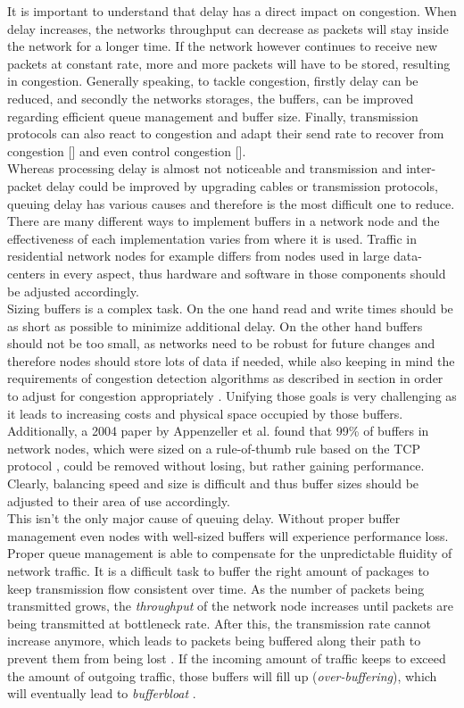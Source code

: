 \documentclass[a4paper,conference]{IEEEtran}
\begin{document}
It is important to understand that delay has a direct impact on congestion. When delay increases, the networks throughput can decrease as packets will stay inside the network for a longer time. If the network however continues to receive new packets at constant rate, more and more packets will have to be stored, resulting in congestion. Generally speaking, to tackle congestion, firstly delay can be reduced, and secondly the networks storages, the buffers, can be improved regarding efficient queue management and buffer size. Finally, transmission protocols can also react to congestion and adapt their send rate to recover from congestion [] and even control congestion [].
\\Whereas processing delay is almost not noticeable and transmission and inter-packet delay could be improved by upgrading cables or transmission protocols, queuing delay has various causes and therefore is the  most difficult one to reduce. There are many different ways to implement buffers in a network node and the effectiveness of each implementation varies from where it is used. Traffic in residential network nodes for example differs from nodes used in large data-centers in every aspect, thus hardware and software in those components should be adjusted accordingly.
\\Sizing buffers is a complex task. On the one hand read and write times should be as short as possible to minimize additional delay. On the other hand buffers should not be too small, as networks need to be robust for future changes and therefore nodes should store lots of data if needed, while also keeping in mind the requirements of congestion detection algorithms as described in section  in order to adjust for congestion appropriately \cite{staff2012bufferbloat}. Unifying those goals is very challenging as it leads to increasing costs and physical space occupied by those buffers. Additionally, a 2004 paper by Appenzeller et al. \cite{appenzeller2004sizing} found that 99\% of buffers in network nodes, which were sized on a rule-of-thumb rule based on the TCP protocol \cite{villamizar1994high}, could be removed without losing, but rather gaining performance. Clearly, balancing speed and size is difficult and thus buffer sizes should be adjusted to their area of use accordingly.
\\This isn't the only major cause of queuing delay. Without proper buffer management even nodes with well-sized buffers will experience performance loss. Proper queue management is able to compensate for the unpredictable fluidity of network traffic. It is a difficult task to buffer the right amount of packages to keep transmission flow consistent over time.
As the number of packets being transmitted grows, the \textit{throughput} of the network node increases until packets are being transmitted at bottleneck rate. After this, the transmission rate cannot increase anymore, which leads to packets being buffered along their path to prevent them from being lost \cite{gettys2012bufferbloat}. If the incoming amount of traffic keeps to exceed the amount of outgoing traffic, those buffers will fill up (\textit{over-buffering}), which will eventually lead to \textit{bufferbloat} \cite{Allman13commentson,6886125}.
\end{document}
